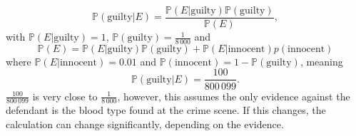 \begin{example}
\begin{enumerate}
		\begin{equation}
			\mathbb{P}(\text{guilty}|E)=\frac{\mathbb{P}(E|\text{guilty})\mathbb{P}(\text{guilty})}{\mathbb{P}(E)},
		\end{equation}
		with $\mathbb{P}(E|\text{guilty}) = 1$, $\mathbb{P}(\text{guilty})=\frac{1}{8\,000}$ and 
		\begin{equation}
			\mathbb{P}(E) = \mathbb{P}(E|\text{guilty})\mathbb{P}(\text{guilty})+\mathbb{P}(E|\text{innocent})p(\text{innocent})
		\end{equation}
		where $\mathbb{P}(E|\text{innocent})=0.01$ and $\mathbb{P}(\text{innocent})=1-\mathbb{P}(\text{guilty})$, meaning
		\begin{equation}
			\mathbb{P}(\text{guilty}|E)=\frac{100}{800\,099}.
		\end{equation}
		$\frac{100}{800\,099}$ is very close to $\frac{1}{8\,000}$, however, this assumes the only evidence against the defendant is the blood type found at the crime scene. If this changes, the calculation can change significantly, depending on the evidence.
		
	\end{enumerate}
\end{example}

